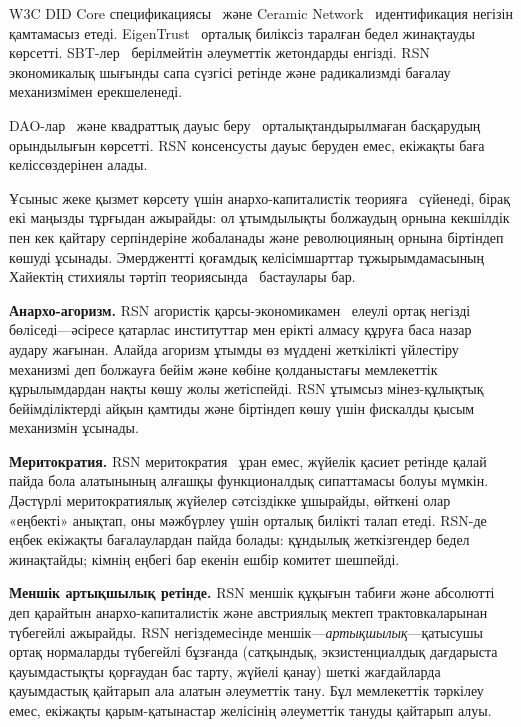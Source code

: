 \documentclass[11pt,a4paper,twocolumn]{article}
\begin{document}
W3C DID Core спецификациясы~\cite{did2022} және Ceramic Network~\cite{ceramic2023} идентификация негізін қамтамасыз етеді. EigenTrust~\cite{kamvar2003} орталық биліксіз таралған бедел жинақтауды көрсетті. SBT-лер~\cite{weyl2022} берілмейтін әлеуметтік жетондарды енгізді. RSN экономикалық шығынды сапа сүзгісі ретінде және радикализмді бағалау механизмімен ерекшеленеді.

DAO-лар~\cite{buterin2014} және квадраттық дауыс беру~\cite{buterin2019} орталықтандырылмаған басқарудың орындылығын көрсетті. RSN консенсусты дауыс беруден емес, екіжақты баға келіссөздерінен алады.

Ұсыныс жеке қызмет көрсету үшін анархо-капиталистік теорияға~\cite{rothbard1973,hoppe2001} сүйенеді, бірақ екі маңызды тұрғыдан ажырайды: ол ұтымдылықты болжаудың орнына кекшілдік пен кек қайтару серпіндеріне жобаланады және революцияның орнына біртіндеп көшуді ұсынады. Эмерджентті қоғамдық келісімшарттар тұжырымдамасының Хайектің стихиялы тәртіп теориясында~\cite{hayek1973} бастаулары бар.

\textbf{Анархо-агоризм.} RSN агористік қарсы-экономикамен~\cite{konkin2006} елеулі ортақ негізді бөліседі---әсіресе қатарлас институттар мен ерікті алмасу құруға баса назар аудару жағынан. Алайда агоризм ұтымды өз мүддені жеткілікті үйлестіру механизмі деп болжауға бейім және көбіне қолданыстағы мемлекеттік құрылымдардан нақты көшу жолы жетіспейді. RSN ұтымсыз мінез-құлықтық бейімділіктерді айқын қамтиды және біртіндеп көшу үшін фискалды қысым механизмін ұсынады.

\textbf{Меритократия.} RSN меритократия~\cite{young1958} ұран емес, жүйелік қасиет ретінде қалай пайда бола алатынының алғашқы функционалдық сипаттамасы болуы мүмкін. Дәстүрлі меритократиялық жүйелер сәтсіздікке ұшырайды, өйткені олар «еңбекті» анықтап, оны мәжбүрлеу үшін орталық билікті талап етеді. RSN-де еңбек екіжақты бағалаулардан пайда болады: құндылық жеткізгендер бедел жинақтайды; кімнің еңбегі бар екенін ешбір комитет шешпейді.

\textbf{Меншік артықшылық ретінде.} RSN меншік құқығын табиғи және абсолютті деп қарайтын анархо-капиталистік және австриялық мектеп трактовкаларынан түбегейлі ажырайды. RSN негіздемесінде меншік---\emph{артықшылық}---қатысушы ортақ нормаларды түбегейлі бұзғанда (сатқындық, экзистенциалдық дағдарыста қауымдастықты қорғаудан бас тарту, жүйелі қанау) шеткі жағдайларда қауымдастық қайтарып ала алатын әлеуметтік тану. Бұл мемлекеттік тәркілеу емес, екіжақты қарым-қатынастар желісінің әлеуметтік тануды қайтарып алуы.
\end{document}
